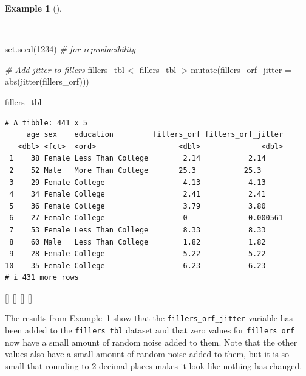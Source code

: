 \documentclass[
  letterpaper,
  krantz1]{latex/krantz-mod}
\newenvironment{Shaded}{\begin{snugshade}}{\end{snugshade}}
\newcommand{\AttributeTok}[1]{\textcolor[rgb]{0.00,0.00,0.00}{#1}}
\newcommand{\CommentTok}[1]{\textcolor[rgb]{0.00,0.00,0.00}{\textit{#1}}}
\newcommand{\DecValTok}[1]{\textcolor[rgb]{0.00,0.00,0.00}{#1}}
\newcommand{\FunctionTok}[1]{\textcolor[rgb]{0.00,0.00,0.00}{#1}}
\newcommand{\NormalTok}[1]{\textcolor[rgb]{0.00,0.00,0.00}{#1}}
\newcommand{\OtherTok}[1]{\textcolor[rgb]{0.00,0.00,0.00}{#1}}
\newcommand{\SpecialCharTok}[1]{\textcolor[rgb]{0.00,0.00,0.00}{#1}}
\newcommand{\cindex}[1]{%
  \StrSubstitute{#1}{_}{\_}[\temp]%
  \index{\temp}%
}
\theoremstyle{definition}
\theoremstyle{definition}
\newtheorem{example}{Example}[chapter]
\theoremstyle{remark}
\begin{document}
\begin{example}[]\protect\hypertarget{exm-infer-num-uni-jitter}{}\label{exm-infer-num-uni-jitter}

~

\begin{Shaded}
\begin{Highlighting}[numbers=left,,]
\FunctionTok{set.seed}\NormalTok{(}\DecValTok{1234}\NormalTok{) }\CommentTok{\# for reproducibility}

\CommentTok{\# Add jitter to fillers}
\NormalTok{fillers\_tbl }\OtherTok{\textless{}{-}}
\NormalTok{  fillers\_tbl }\SpecialCharTok{|\textgreater{}}
  \FunctionTok{mutate}\NormalTok{(}\AttributeTok{fillers\_orf\_jitter =} \FunctionTok{abs}\NormalTok{(}\FunctionTok{jitter}\NormalTok{(fillers\_orf)))}

\NormalTok{fillers\_tbl}
\end{Highlighting}
\end{Shaded}

\begin{verbatim}
# A tibble: 441 x 5
     age sex    education         fillers_orf fillers_orf_jitter
   <dbl> <fct>  <ord>                   <dbl>              <dbl>
 1    38 Female Less Than College        2.14           2.14    
 2    52 Male   More Than College       25.3           25.3     
 3    29 Female College                  4.13           4.13    
 4    34 Female College                  2.41           2.41    
 5    36 Female College                  3.79           3.80    
 6    27 Female College                  0              0.000561
 7    53 Female Less Than College        8.33           8.33    
 8    60 Male   Less Than College        1.82           1.82    
 9    28 Female College                  5.22           5.22    
10    35 Female College                  6.23           6.23    
# i 431 more rows
\end{verbatim}

\cindex{mutate()}\cindex{jitter()}\cindex{abs()}\cindex{set.seed()}

\end{example}

The results from Example~\ref{exm-infer-num-uni-jitter} show that the
\texttt{fillers\_orf\_jitter} variable has been added to the
\texttt{fillers\_tbl} dataset and that zero values for
\texttt{fillers\_orf} now have a small amount of random noise added to
them. Note that the other values also have a small amount of random
noise added to them, but it is so small that rounding to 2 decimal
places makes it look like nothing has changed.
\end{document}
